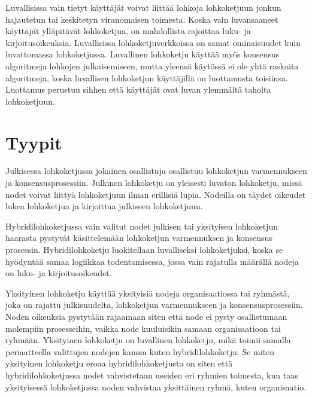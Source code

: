 \documentclass[utf8,bachelor]{gradu3}
\begin{document}
Luvallisissa vain tietyt käyttäjät voivat liittää lohkoja lohkoketjuun jonkun hajautetun tai keskitetyn viranomaisen toimesta.
Koska vain luvansaaneet käyttäjät ylläpitävät lohkoketjua, on mahdollista rajoittaa luku- ja kirjoitusoikeuksia.
Luvallisissa lohkoketjuverkkoissa on samat ominaisuudet kuin luvattomassa lohkoketjussa.
Luvallinen lohkoketju käyttää myös konsensus algoritmeja lohkojen julkaisemiseen, mutta yleensä käytössä ei ole yhtä raskaita algoritmeja, koska luvallisen lohkoketjun käyttäjillä on luottamusta toisiinsa. Luottamus perustuu sihhen että käyttäjät ovat luvan ylemmältä taholta lohkoketjuun.

\section{Tyypit}


Julkisessa lohkoketjussa jokainen osallistuja osallistuu lohkoketjun varmennukseen ja konsensusprosessiin. Julkinen lohkoketju on yleisesti luvaton lohkoketju, missä nodet voivat liittyä lohkoketjuun ilman erillisiä lupia. Nodeilla on täydet oikeudet lukea lohkoketjua ja kirjoittaa julkiseen lohkoketjuun.

Hybridilohkoketjussa vain valitut nodet julkisen tai yksityisen lohkoketjun haarasta pystyvät käsittelemään lohkoketjun varmennuksen ja konsensus prosessin. Hybridilohkoketju luokitellaan luvalliseksi lohkoketjuksi, koska se hyödyntää samaa logiikkaa todentamisessa, jossa vain rajatulla määrällä nodeja on luku- ja kirjoitusoikeudet.

Yksityinen lohkoketju käyttää yksityisiä nodeja organisaatiossa tai ryhmästä, joka on rajattu julkisuudelta, lohkoketjun varmennukseen ja konsensusprosessiin. Noden oikeuksia pystytään rajaamaan siten että node ei pysty osallistumaan molempiin prosesseihin, vaikka node kuuluisikin samaan organisaatioon tai ryhmään.  Yksityinen lohkoketju on luvallinen lohkoketju, mikä toimii samalla periaatteella valittujen nodejen kanssa kuten hybridilohkoketju. Se miten yksityinen lohkoketju eroaa hybridilohkoketjusta on siten että hybridilohkoketjussa nodet vahvistetaan useiden eri ryhmien toimesta, kun taas yksityisessä lohkoketjussa noden vahvistaa yksittäinen ryhmä, kuten organisaatio.
\end{document}

